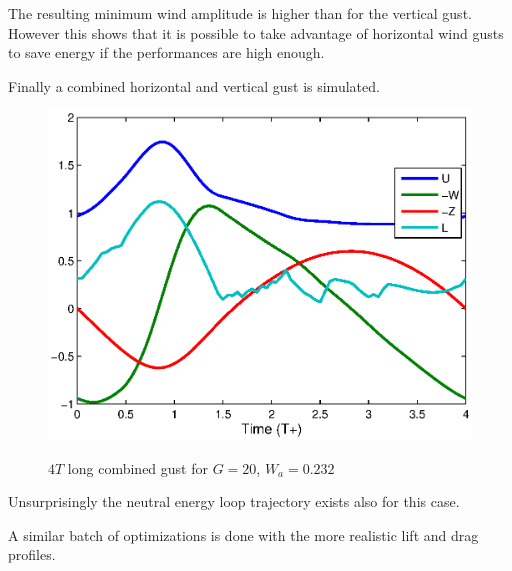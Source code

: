 The resulting minimum wind amplitude is higher than for the vertical gust. 
However this shows that it is possible to take advantage of horizontal wind gusts to save energy if the performances are high enough.

\par Finally a combined horizontal and vertical gust is simulated.

\begin{figure}[h]
  \begin{center}
    \scalebox{1.0}
    {\includegraphics{./Figures/Windtype=3_Tg=4_Wg=0p232_quad_G=20.eps}}
  \end{center}
  \caption{$4T$ long combined gust for $G=20$, $W_a=0.232$}
  \label{fig:combined_optimization}
\end{figure}

Unsurprisingly the neutral energy loop trajectory exists also for this case.

\FloatBarrier


\par A similar batch of optimizations is done with the more realistic lift and drag profiles.

